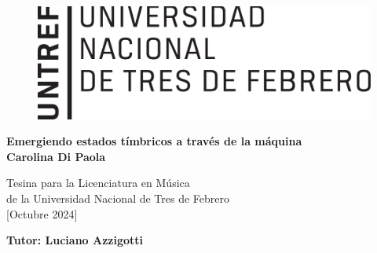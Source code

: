 \begin{titlepage}


\begin{figure} [h!]
 	\begin{flushright}
 		\includegraphics[scale=0.40]{logo_untref}
 	\end{flushright}
\end{figure}

 	\begin{center}

 		\vspace{1.5cm}
		{\LARGE \textbf {Emergiendo estados tímbricos a través de la máquina}}\\
		\vspace{2cm}
		{\Large \textbf {Carolina Di Paola}}
		
		\vspace{11cm}
		
		{\Large Tesina para la Licenciatura en Música\\[0.2em] de la Universidad Nacional de Tres de Febrero\\[0.8em] 
			[Octubre 2024]}
		
 				\vspace{1cm}
 		
 		{\Large \textbf{Tutor: Luciano Azzigotti}}
	\end{center}
\end{titlepage}
 